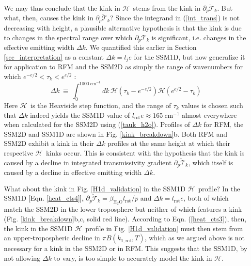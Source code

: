 \documentclass{ametsoc}
\newcommand{\beqn}{\begin{equation}}
\newcommand{\eeqn}{\end{equation}}
\newcommand{\eqnref}[1]{(\ref{#1})}
\newcommand{\cminverse}{\ensuremath{\mathrm{cm^{-1}}}}
\newcommand{\ppp}{\ensuremath{\partial_p}}
\newcommand{\htwo}{\ensuremath{\mathrm{H_2O}}}
\newcommand{\trans}{\ensuremath{\mathcal{T}}}
\newcommand{\ch}{\ensuremath{\mathcal{H}}}
\newcommand{\lj}{\ensuremath{l_j}}
\newcommand{\tauk}{\ensuremath{\tau_k}}
\newcommand{\krot}{\ensuremath{k_\mathrm{rot}}}
\newcommand{\konerot}{\ensuremath{k_{1,\mathrm{rot}}}}
\newcommand{\lrot}{\ensuremath{l_\mathrm{rot}}}
\newcommand{\rot}{\ensuremath{\textbf{rot}}}
\begin{document}
We may thus conclude that the kink in \ch\ stems from the kink in $\overline{\ppp \trans_k}$. But what, then,  causes the kink in $\overline{\ppp \trans_k}$? Since the integrand in \eqnref{int_trans} is not decreasing with height,  a plausible alternative hypothesis is that the kink is due to  changes in the spectral range over which $\ppp \trans_k$ is significant, i.e. changes in  the effective emitting width $\Delta k$. We quantified this earlier in Section \ref{sec_interpretation} as a constant $\Delta k = \lj e$ for the SSM1D, but now generalize it for application to RFM and the SSM2D as simply the range of wavenumbers for which $e^{-e/2} < \tauk < e^{e/2}$ :
\beqn
	\Delta k \ \equiv \  \int_0^{1000\ \cminverse} dk\, \ch(\tauk-e^{-e/2})\ch(e^{e/2}-\tauk)
	\label{eqn_deltak}
\eeqn
Here \ch\ is the Heaviside step function, and the range of $\tauk$ values is chosen such that $\Delta k$ indeed yields the SSM1D value of $\lrot e\approx 165\ \cminverse$  almost everywhere when calculated for the SSM2D using \eqnref{tauk_h2o}. Profiles of $\Delta k$ for RFM, the SSM2D and SSM1D are shown in Fig. \ref{kink_breakdown}b.  Both RFM and SSM2D exhibit a kink in their $\Delta k$ profiles at the same height at which their respective \ch\ kinks occur. This is consistent with the hypothesis that  the kink is caused by a decline in integrated transmissivity gradient $\overline{\ppp \trans_k}$, which itself is caused by a decline in effective emitting width $\Delta k$. 


What about the kink in Fig. \ref{H1d_validation} in the SSM1D \ch\ profile? In the SSM1D [Eqn. \ref{heat_cts4}], $\overline{\ppp \trans_k} = \beta_{\htwo}\lrot/p$ and $\Delta k = \lrot e$, both of which match the SSM2D in the lower troposphere but neither of which features a kink (Fig. \ref{kink_breakdown}b,c, solid red line).  According to Eqn. \eqnref{heat_cts3}, then, the kink in the SSM1D \ch\ profile in Fig. \ref{H1d_validation} must then stem from an upper-tropospheric decline in $\pi B(\konerot,T)$, which as we argued above is not necessary for a kink in the SSM2D or in RFM. This suggests that the SSM1D, by not allowing $\Delta k$ to vary, is too simple to accurately model the kink in \ch.

\end{document}
